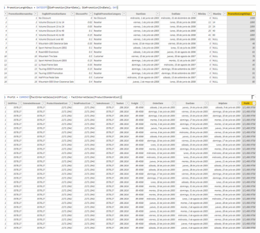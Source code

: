 \documentclass[12pt,letterpaper]{article}
\begin{document}
\begin{center}
\includegraphics[width=16cm]{images/17}\newline
\end{center}
\begin{center}
\includegraphics[width=16cm]{images/18}\newline
\end{center}
\end{document}
